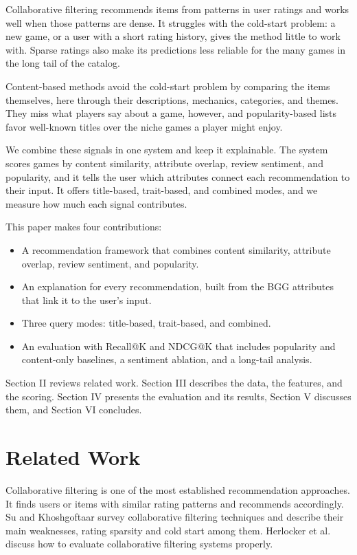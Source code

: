 \documentclass[conference]{IEEEtran}
\begin{document}
Collaborative filtering recommends items from patterns in user ratings and works well when those patterns are dense. It struggles with the cold-start problem: a new game, or a user with a short rating history, gives the method little to work with. Sparse ratings also make its predictions less reliable for the many games in the long tail of the catalog.

Content-based methods avoid the cold-start problem by comparing the items themselves, here through their descriptions, mechanics, categories, and themes. They miss what players say about a game, however, and popularity-based lists favor well-known titles over the niche games a player might enjoy.

We combine these signals in one system and keep it explainable. The system scores games by content similarity, attribute overlap, review sentiment, and popularity, and it tells the user which attributes connect each recommendation to their input. It offers title-based, trait-based, and combined modes, and we measure how much each signal contributes.

This paper makes four contributions:

\begin{itemize}
    \item A recommendation framework that combines content similarity, attribute overlap, review sentiment, and popularity.

    \item An explanation for every recommendation, built from the BGG attributes that link it to the user's input.

    \item Three query modes: title-based, trait-based, and combined.

    \item An evaluation with Recall@K and NDCG@K that includes popularity and content-only baselines, a sentiment ablation, and a long-tail analysis.
\end{itemize}

Section II reviews related work. Section III describes the data, the features, and the scoring. Section IV presents the evaluation and its results, Section V discusses them, and Section VI concludes.

\section{Related Work}

Collaborative filtering is one of the most established recommendation approaches. It finds users or items with similar rating patterns and recommends accordingly. Su and Khoshgoftaar \cite{su2009survey} survey collaborative filtering techniques and describe their main weaknesses, rating sparsity and cold start among them. Herlocker et al. \cite{herlocker2004evaluating} discuss how to evaluate collaborative filtering systems properly.
\end{document}
